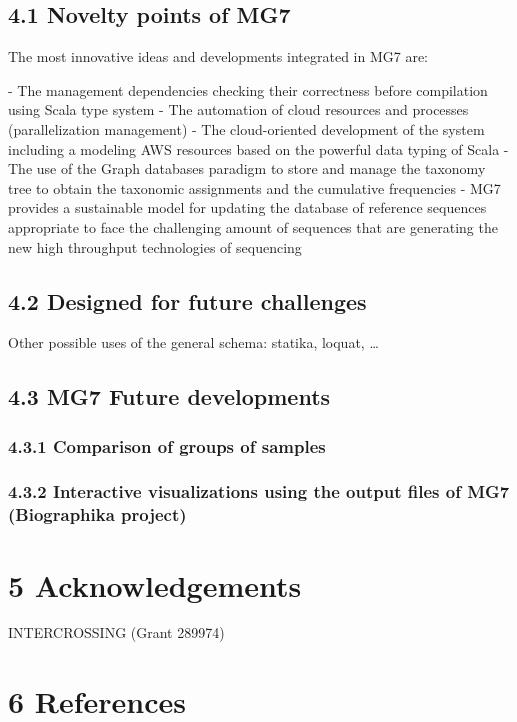 \documentclass{frontiersSCNS} %
\begin{document}
\subsection{4.1 Novelty points of MG7}\label{novelty-points-of-mg7}

The most innovative ideas and developments integrated in MG7 are:

­- The management dependencies checking their correctness before
compilation using Scala type system - The automation of cloud resources
and processes (parallelization management) - The cloud-oriented
development of the system including a modeling AWS resources based on
the powerful data typing of Scala - The use of the Graph databases
paradigm to store and manage the taxonomy tree to obtain the taxonomic
assignments and the cumulative frequencies - MG7 provides a sustainable
model for updating the database of reference sequences appropriate to
face the challenging amount of sequences that are generating the new
high throughput technologies of sequencing

\subsection{4.2 Designed for future
challenges}\label{designed-for-future-challenges}

Other possible uses of the general schema: statika, loquat, \ldots{}

\subsection{4.3 MG7 Future developments}\label{mg7-future-developments}

\subsubsection{4.3.1 Comparison of groups of
samples}\label{comparison-of-groups-of-samples}

\subsubsection{4.3.2 Interactive visualizations using the output files
of MG7 (Biographika
project)}\label{interactive-visualizations-using-the-output-files-of-mg7-biographika-project}

\section{5 Acknowledgements}\label{acknowledgements}

INTERCROSSING (Grant 289974)

\section{6 References}\label{references}


\end{document}
